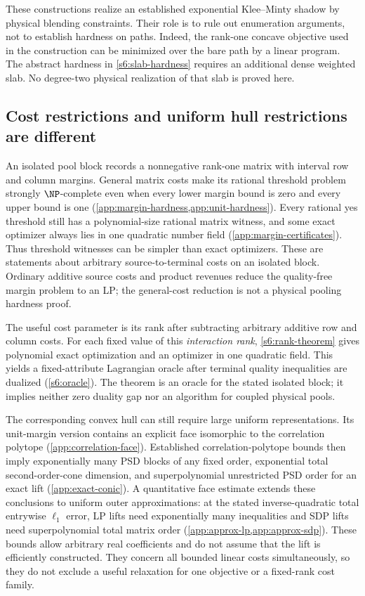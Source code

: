 These constructions realize an established exponential Klee--Minty
shadow \cite{s6:gartner2013} by physical blending constraints. Their role
is to rule out enumeration arguments, not to establish hardness on
paths. Indeed, the rank-one concave objective used in the construction
can be minimized over the bare path by a linear program. The abstract
hardness in \cref{s6:slab-hardness} requires an additional dense weighted
slab. No degree-two physical realization of that slab is proved here.

\subsection{Cost restrictions and uniform hull restrictions are different}
An isolated pool block records a nonnegative rank-one matrix with
interval row and column margins. General matrix costs make its rational
threshold problem strongly $\NP$-complete even when every lower margin
bound is zero and every upper bound is one
(\cref{app:margin-hardness,app:unit-hardness}). Every rational yes threshold
still has a polynomial-size rational matrix witness, and some exact
optimizer always lies in one quadratic number field
(\cref{app:margin-certificates}). Thus threshold witnesses can be simpler
than exact optimizers. These are statements about arbitrary
source-to-terminal costs on an isolated block. Ordinary additive source
costs and product revenues reduce the quality-free margin problem to an
LP; the general-cost reduction is not a physical pooling hardness proof.

The useful cost parameter is its rank after subtracting arbitrary
additive row and column costs. For each fixed value of this
\emph{interaction rank}, \cref{s6:rank-theorem} gives polynomial exact
optimization and an optimizer in one quadratic field. This yields a
fixed-attribute Lagrangian oracle after terminal quality inequalities
are dualized (\cref{s6:oracle}). The theorem is an oracle for the stated
isolated block; it implies neither zero duality gap nor an algorithm
for coupled physical pools.

The corresponding convex hull can still require large uniform
representations. Its unit-margin version contains an explicit face
isomorphic to the correlation polytope (\cref{app:correlation-face}).
Established correlation-polytope bounds then imply exponentially many
PSD blocks of any fixed order, exponential total second-order-cone
dimension, and superpolynomial unrestricted PSD order for an exact lift
(\cref{app:exact-conic}). A quantitative face estimate extends these
conclusions to uniform outer approximations: at the stated
inverse-quadratic total entrywise $\ell_1$ error, LP lifts need exponentially many
inequalities and SDP lifts need superpolynomial total matrix order
(\cref{app:approx-lp,app:approx-sdp}). These bounds allow arbitrary real
coefficients and do not assume that the lift is efficiently constructed.
They concern all bounded linear costs simultaneously, so they do not
exclude a useful relaxation for one objective or a fixed-rank cost family.

